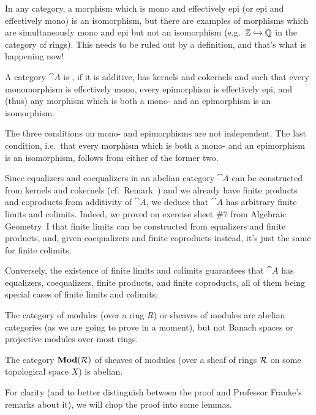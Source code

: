 \documentclass[a4paper,parskip=half,numbers=enddot, DIV=12]{scrreprt}
\begin{document}
	In any category, a morphism which is mono and effectively epi (or epi and effectively mono) is an isomorphism, but there are examples of morphisms which are simultaneously mono and epi but not an isomorphism (e.g.\ $\IZ\monomorphism\IQ$ in the category of rings). This needs to be ruled out by a definition, and that's what is happening now!
\begin{defi}
	A category ${\cat A}$ is , if it is additive, has kernels and cokernels and such that every monomorphism is effectively mono, every epimorphism is effectively epi, and (thus) any morphism which is both a mono- and an epimorphism is an isomorphism.
\end{defi}
\begin{rem*}
	\begin{alphanumerate}
		\item The three conditions on mono- and epimorphisms are not independent. The last condition, i.e.\ that every morphism which is both a mono- and an epimorphism is an isomorphism, follows from either of the former two.
		\item Since equalizers and coequalizers in an abelian category ${\cat A}$ can be constructed from kernels and cokernels (cf.\ Remark~) and we already have finite products and coproducts from additivity of ${\cat A}$, we deduce that ${\cat A}$ has arbitrary finite limits and colimits. Indeed, we proved on exercise sheet \#7 from Algebraic Geometry~I that finite limits can be constructed from equalizers and finite products, and, given coequalizers and finite coproducts instead, it's just the same for finite colimits.
		
		Conversely, the existence of finite limits and colimits guarantees that ${\cat A}$ has equalizers, coequalizers, finite products, and finite coproducts, all of them being special cases of finite limits and colimits.
	\end{alphanumerate}
	
\end{rem*}
The category of modules (over a ring $R$) or sheaves of modules are abelian categories (as we are going to prove in a moment), but not Banach spaces or projective modules over most rings.
\begin{prop}
	The category $\cat{Mod}(\Rr)$ of sheaves of modules (over a sheaf of rings $\mathcal{R}$ on some topological space $X$) is abelian.
\end{prop}
For clarity (and to better distinguish between the proof and Professor Franke's remarks about it), we will chop the proof into some lemmas.
\end{document}

